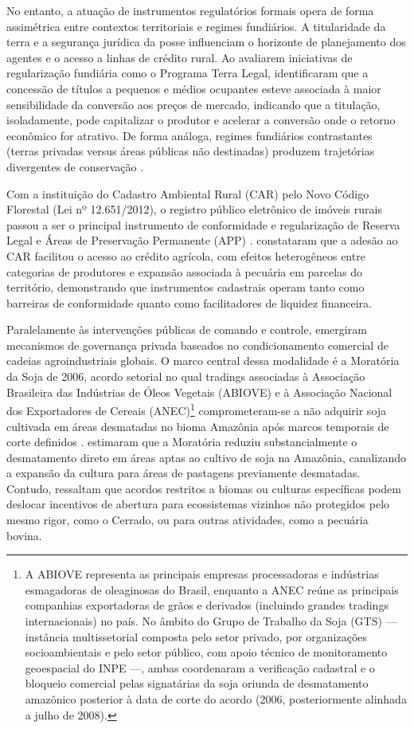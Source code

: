 No entanto, a atuação de instrumentos regulatórios formais opera de forma assimétrica entre contextos territoriais e regimes fundiários. A titularidade da terra e a segurança jurídica da posse influenciam o horizonte de planejamento dos agentes e o acesso a linhas de crédito rural. Ao avaliarem iniciativas de regularização fundiária como o Programa Terra Legal,  identificaram que a concessão de títulos a pequenos e médios ocupantes esteve associada à maior sensibilidade da conversão aos preços de mercado, indicando que a titulação, isoladamente, pode capitalizar o produtor e acelerar a conversão onde o retorno econômico for atrativo. De forma análoga, regimes fundiários contrastantes (terras privadas versus áreas públicas não destinadas) produzem trajetórias divergentes de conservação \cite{PachecoMeyer2022}.

Com a instituição do Cadastro Ambiental Rural (CAR) pelo Novo Código Florestal (Lei nº 12.651/2012), o registro público eletrônico de imóveis rurais passou a ser o principal instrumento de conformidade e regularização de Reserva Legal e Áreas de Preservação Permanente (APP) \cite{Brasil2012}.  constataram que a adesão ao CAR facilitou o acesso ao crédito agrícola, com efeitos heterogêneos entre categorias de produtores e expansão associada à pecuária em parcelas do território, demonstrando que instrumentos cadastrais operam tanto como barreiras de conformidade quanto como facilitadores de liquidez financeira.

Paralelamente às intervenções públicas de comando e controle, emergiram mecanismos de governança privada baseados no condicionamento comercial de cadeias agroindustriais globais. O marco central dessa modalidade é a Moratória da Soja de 2006, acordo setorial no qual tradings associadas à Associação Brasileira das Indústrias de Óleos Vegetais (ABIOVE) e à Associação Nacional dos Exportadores de Cereais (ANEC)\footnote{A ABIOVE representa as principais empresas processadoras e indústrias esmagadoras de oleaginosas do Brasil, enquanto a ANEC reúne as principais companhias exportadoras de grãos e derivados (incluindo grandes tradings internacionais) no país. No âmbito do Grupo de Trabalho da Soja (GTS) — instância multissetorial composta pelo setor privado, por organizações socioambientais e pelo setor público, com apoio técnico de monitoramento geoespacial do INPE —, ambas coordenaram a verificação cadastral e o bloqueio comercial pelas signatárias da soja oriunda de desmatamento amazônico posterior à data de corte do acordo (2006, posteriormente alinhada a julho de 2008).} comprometeram-se a não adquirir soja cultivada em áreas desmatadas no bioma Amazônia após marcos temporais de corte definidos \cite{HardingEtAl2021, HeilmayrEtAl2020}.  estimaram que a Moratória reduziu substancialmente o desmatamento direto em áreas aptas ao cultivo de soja na Amazônia, canalizando a expansão da cultura para áreas de pastagens previamente desmatadas. Contudo,  ressaltam que acordos restritos a biomas ou culturas específicas podem deslocar incentivos de abertura para ecossistemas vizinhos não protegidos pelo mesmo rigor, como o Cerrado, ou para outras atividades, como a pecuária bovina.

